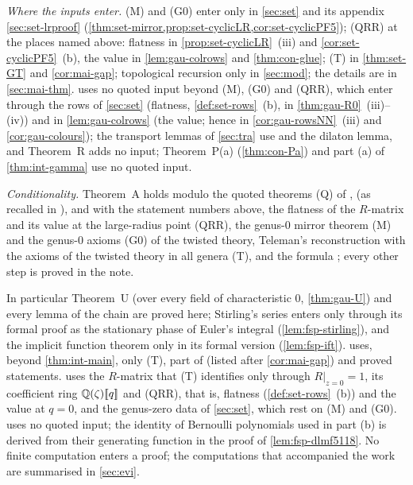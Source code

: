 \emph{Where the inputs enter.} (M) and (G0) enter only in \cref{sec:set} and its appendix \cref{sec:set-lrproof} (\cref{thm:set-mirror,prop:set-cyclicLR,cor:set-cyclicPF5}); (QRR) at the places named above: flatness in \cref{prop:set-cyclicLR}~(iii) and \cref{cor:set-cyclicPF5}~(b), the value in \cref{lem:gau-colrows} and \cref{thm:con-glue}; (T) in \cref{thm:set-GT} and \cref{cor:mai-gap}; topological recursion only in \cref{sec:mod}; the details are in \cref{sec:mai-thm}.  uses no quoted input beyond (M), (G0) and (QRR), which enter through the rows of \cref{sec:set} (flatness, \cref{def:set-rows}~(b), in \cref{thm:gau-R0}~(iii)--(iv)) and in \cref{lem:gau-colrows} (the value; hence in \cref{cor:gau-rowsNN}~(iii) and \cref{cor:gau-colours}); the transport lemmas of \cref{sec:tra} use \cite[Defs.~2.2, 2.13]{PPZ15} and the dilaton lemma, and Theorem~R adds no input; Theorem~P(a) (\cref{thm:con-Pa}) and part (a) of \cref{thm:int-gamma} use no quoted input.

\emph{Conditionality.} Theorem~A holds modulo the quoted theorems (Q) of \cite{Eynard:2007kz}, \cite{DuninBarkowski:2012bw} (as recalled in \cite{Dunin-Barkowski:2015caa}), \cite{ABDKS25} and \cite{PPZ15} with the statement numbers above, the flatness of the $R$-matrix and its value at the large-radius point (QRR), the genus-$0$ mirror theorem (M) and the genus-$0$ axioms (G0) of the twisted theory, Teleman's reconstruction with the axioms of the twisted theory in all genera (T), and the formula \cite[(1.7)]{AC96}; every other step is proved in the note.

In particular Theorem~U (over every field of characteristic $0$, \cref{thm:gau-U}) and every lemma of the chain are proved here; Stirling's series enters only through its formal proof as the stationary phase of Euler's integral (\cref{lem:fsp-stirling}), and the implicit function theorem only in its formal version (\cref{lem:fsp-ift}).  uses, beyond \cref{thm:int-main}, only (T), part of \cite{PPZ15} (listed after \cref{cor:mai-gap}) and proved statements.  uses the $R$-matrix that (T) identifies only through $R|_{z=0}=1$, its coefficient ring $\mathbb{Q}(\zeta)[\![ q ]\!]$ and (QRR), that is, flatness (\cref{def:set-rows}~(b)) and the value at $q=0$, and the genus-zero data of \cref{sec:set}, which rest on (M) and (G0).  uses no quoted input; the identity \cite[24.4.1]{DLMF} of Bernoulli polynomials used in part (b) is derived from their generating function in the proof of \cref{lem:fsp-dlmf5118}. No finite computation enters a proof; the computations that accompanied the work are summarised in \cref{sec:evi}.

